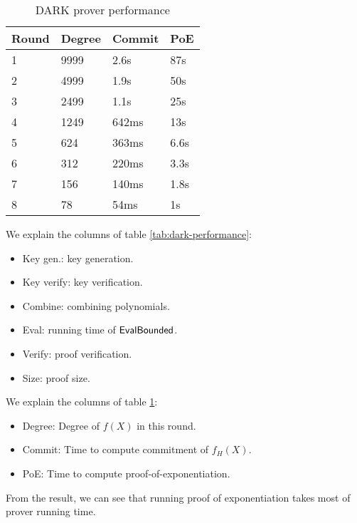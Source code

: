 \begin{table}[!htp]
\centering
\begin{tabular}{|l|l|l|l|}
\hline
Round & Degree & Commit & PoE  \\ \hline
1     & 9999   & 2.6s   & 87s  \\ \hline
2     & 4999   & 1.9s   & 50s  \\ \hline
3     & 2499   & 1.1s   & 25s  \\ \hline
4     & 1249   & 642ms  & 13s  \\ \hline
5     & 624    & 363ms  & 6.6s \\ \hline
6     & 312    & 220ms  & 3.3s \\ \hline
7     & 156    & 140ms  & 1.8s \\ \hline
8     & 78     & 54ms   & 1s   \\ \hline
\end{tabular}
\caption{DARK prover performance}
\label{tab:prover-performance}
\end{table}

We explain the columns of table \ref{tab:dark-performance}:
\begin{itemize}
    \item Key gen.: key generation.
    \item Key verify: key verification.
    \item Combine: combining polynomials.
    \item Eval: running time of $\mathsf{EvalBounded}$.
    \item Verify: proof verification.
    \item Size: proof size.
\end{itemize}

We explain the columns of table \ref{tab:prover-performance}:
\begin{itemize}
    \item Degree: Degree of $f(X)$ in this round.
    \item Commit: Time to compute commitment of $f_H(X)$.
    \item PoE: Time to compute proof-of-exponentiation.
\end{itemize}

From the result, we can see that running proof of exponentiation takes most of prover running time.